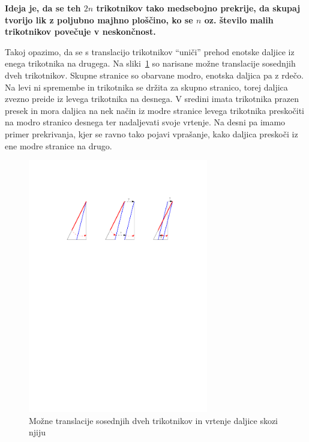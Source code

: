 \documentclass[a4paper, 12pt]{article}
\begin{document}
\textbf{Ideja je, da se teh $ 2n $ trikotnikov tako medsebojno prekrije, da skupaj tvorijo lik z poljubno majhno ploščino, ko se $ n $ oz. število malih trikotnikov povečuje v neskončnost.}

Takoj opazimo, da se s translacijo trikotnikov ``uniči'' prehod enotske daljice iz enega trikotnika na drugega. Na sliki~\ref{preskok1} so narisane možne translacije sosednjih dveh trikotnikov. Skupne stranice so obarvane modro, enotska daljica pa z rdečo. Na levi ni spremembe in trikotnika se držita za skupno stranico, torej daljica zvezno preide iz levega trikotnika na desnega. V sredini imata trikotnika prazen presek in mora daljica na nek način iz modre stranice levega trikotnika preskočiti na modro stranico desnega ter nadaljevati svoje vrtenje. Na desni pa imamo primer prekrivanja, kjer se ravno tako pojavi vprašanje, kako daljica preskoči iz ene modre stranice na drugo.

\begin{figure}[h!]
    \centering
    \includegraphics[width=0.7\textwidth]{ipe_slike/preskok1.pdf}
    \caption{Možne translacije sosednjih dveh trikotnikov in vrtenje daljice skozi njiju}
    \label{preskok1}
\end{figure}

\end{document}
